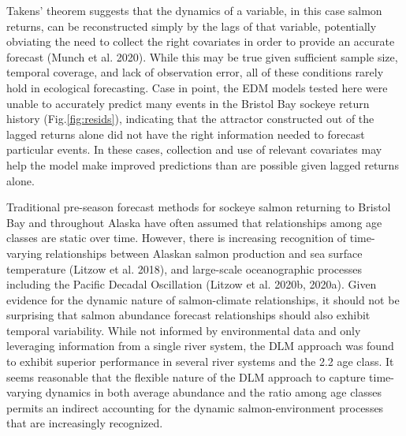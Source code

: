 \documentclass[
]{article}
\begin{document}
Takens' theorem suggests that the dynamics of a variable, in this case salmon returns, can be reconstructed simply by the lags of that variable, potentially obviating the need to collect the right covariates in order to provide an accurate forecast (Munch et al. 2020). While this may be true given sufficient sample size, temporal coverage, and lack of observation error, all of these conditions rarely hold in ecological forecasting. Case in point, the EDM models tested here were unable to accurately predict many events in the Bristol Bay sockeye return history (Fig.\ref{fig:resids}), indicating that the attractor constructed out of the lagged returns alone did not have the right information needed to forecast particular events. In these cases, collection and use of relevant covariates may help the model make improved predictions than are possible given lagged returns alone.

Traditional pre-season forecast methods for sockeye salmon returning to Bristol Bay and throughout Alaska have often assumed that relationships among age classes are static over time. However, there is increasing recognition of time-varying relationships between Alaskan salmon production and sea surface temperature (Litzow et al. 2018), and large-scale oceanographic processes including the Pacific Decadal Oscillation (Litzow et al. 2020b, 2020a). Given evidence for the dynamic nature of salmon-climate relationships, it should not be surprising that salmon abundance forecast relationships should also exhibit temporal variability. While not informed by environmental data and only leveraging information from a single river system, the DLM approach was found to exhibit superior performance in several river systems and the 2.2 age class. It seems reasonable that the flexible nature of the DLM approach to capture time-varying dynamics in both average abundance and the ratio among age classes permits an indirect accounting for the dynamic salmon-environment processes that are increasingly recognized.
\end{document}
